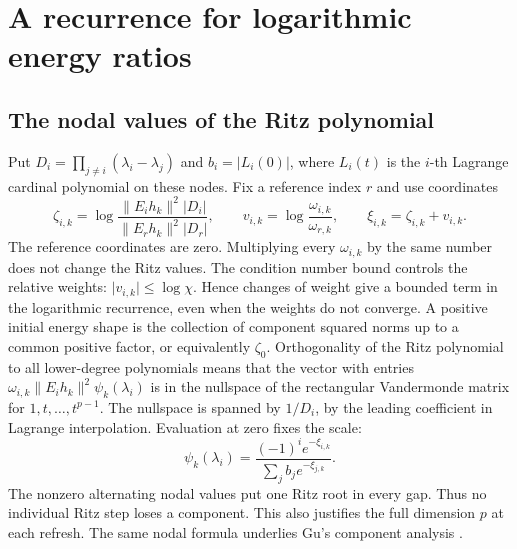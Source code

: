 \documentclass[11pt,a4paper]{article}
\numberwithin{equation}{section}
\newcommand{\norm}[1]{\lVert#1\rVert}
\newcommand{\abs}[1]{\lvert#1\rvert}
\begin{document}
\section{A recurrence for logarithmic energy ratios}\label{sec:recurrence}

\subsection{The nodal values of the Ritz polynomial}

Put \(D_i=\prod_{j\ne i}(\lambda_i-\lambda_j)\) and \(b_i=\abs{L_i(0)}\), where \(L_i(t)\) is the \(i\)-th Lagrange cardinal polynomial on these nodes. Fix a reference index \(r\) and use coordinates
\[
 \zeta_{i,k}=\log\frac{\norm{E_i h_k}^2\abs{D_i}}
                      {\norm{E_r h_k}^2\abs{D_r}},
 \qquad v_{i,k}=\log\frac{\omega_{i,k}}{\omega_{r,k}},
 \qquad \xi_{i,k}=\zeta_{i,k}+v_{i,k}.
\]
The reference coordinates are zero. Multiplying every \(\omega_{i,k}\) by the same number does not change the Ritz values. The condition number bound controls the relative weights: \(\abs{v_{i,k}}\le\log\chi\). Hence changes of weight give a bounded term in the logarithmic recurrence, even when the weights do not converge. A positive initial energy shape is the collection of component squared norms up to a common positive factor, or equivalently \(\zeta_0\). Orthogonality of the Ritz polynomial to all lower-degree polynomials means that the vector with entries \(\omega_{i,k}\norm{E_i h_k}^2\psi_k(\lambda_i)\) is in the nullspace of the rectangular Vandermonde matrix for \(1,t,\ldots,t^{p-1}\). The nullspace is spanned by \(1/D_i\), by the leading coefficient in Lagrange interpolation. Evaluation at zero fixes the scale:
\begin{equation}\label{eq:filter}
 \psi_k(\lambda_i)=\frac{(-1)^i e^{-\xi_{i,k}}}
                         {\sum_j b_j e^{-\xi_{j,k}}}.
\end{equation}
The nonzero alternating nodal values put one Ritz root in every gap. Thus no individual Ritz step loses a component. This also justifies the full dimension \(p\) at each refresh. The same nodal formula underlies Gu's component analysis \cite[Sec.~3]{Gu}.
\end{document}
